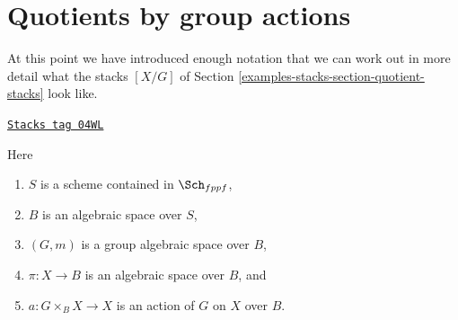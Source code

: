 \section{Quotients by group actions}
\label{examples-stacks-section-group-quotient-stacks}
At this point we have introduced enough notation that we can work out
in more detail what the stacks $[X/G]$ of
Section \ref{examples-stacks-section-quotient-stacks}
look like.

\begin{definition}
\label{examples-stacks-situation-quotient-stack}
\href{https://stacks.math.columbia.edu/tag/04WL}{\texttt{Stacks tag 04WL}}

Here
\begin{enumerate}
\item $S$ is a scheme contained in $\Sch_{fppf}$,
\item $B$ is an algebraic space over $S$,
\item $(G, m)$ is a group algebraic space over $B$,
\item $\pi : X \to B$ is an algebraic space over $B$, and
\item $a : G \times_B X \to X$ is an action of $G$ on $X$ over $B$.
\end{enumerate}
\end{definition}

